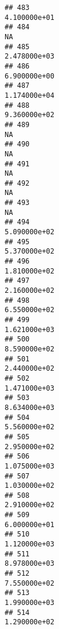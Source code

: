 \documentclass[
]{article}
\begin{document}
\begin{verbatim}
## 483                                                               4.100000e+01
## 484                                                                         NA
## 485                                                               2.478000e+03
## 486                                                               6.900000e+00
## 487                                                               1.174000e+04
## 488                                                               9.360000e+02
## 489                                                                         NA
## 490                                                                         NA
## 491                                                                         NA
## 492                                                                         NA
## 493                                                                         NA
## 494                                                               5.090000e+02
## 495                                                               5.370000e+02
## 496                                                               1.810000e+02
## 497                                                               2.160000e+02
## 498                                                               6.550000e+02
## 499                                                               1.621000e+03
## 500                                                               8.590000e+02
## 501                                                               2.440000e+02
## 502                                                               1.471000e+03
## 503                                                               8.634000e+03
## 504                                                               5.560000e+02
## 505                                                               2.950000e+02
## 506                                                               1.075000e+03
## 507                                                               1.030000e+02
## 508                                                               2.910000e+02
## 509                                                               6.000000e+01
## 510                                                               1.120000e+03
## 511                                                               8.978000e+03
## 512                                                               7.550000e+02
## 513                                                               1.990000e+03
## 514                                                               1.290000e+02

\end{verbatim}
\end{document}
